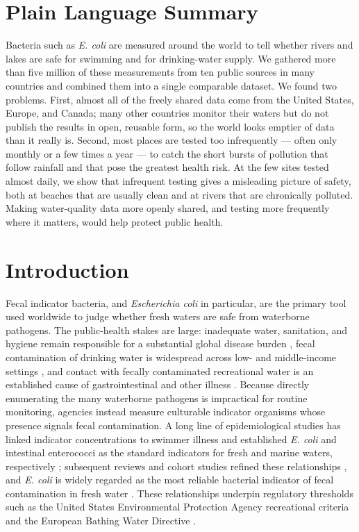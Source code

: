 \documentclass{agujournal2019}
\begin{document}
\section*{Plain Language Summary}
Bacteria such as \textit{E. coli} are measured around the world to tell whether rivers and lakes are safe for swimming and for drinking-water supply. We gathered more than five million of these measurements from ten public sources in many countries and combined them into a single comparable dataset. We found two problems. First, almost all of the freely shared data come from the United States, Europe, and Canada; many other countries monitor their waters but do not publish the results in open, reusable form, so the world looks emptier of data than it really is. Second, most places are tested too infrequently --- often only monthly or a few times a year --- to catch the short bursts of pollution that follow rainfall and that pose the greatest health risk. At the few sites tested almost daily, we show that infrequent testing gives a misleading picture of safety, both at beaches that are usually clean and at rivers that are chronically polluted. Making water-quality data more openly shared, and testing more frequently where it matters, would help protect public health.

\section{Introduction}

Fecal indicator bacteria, and \textit{Escherichia coli} in particular, are the primary tool used worldwide to judge whether fresh waters are safe from waterborne pathogens. The public-health stakes are large: inadequate water, sanitation, and hygiene remain responsible for a substantial global disease burden \cite{prssustn2014burden,prssstn2019burden,wolf2023burden}, fecal contamination of drinking water is widespread across low- and middle-income settings \cite{bain2014fecal,bain2014global}, and contact with fecally contaminated recreational water is an established cause of gastrointestinal and other illness \cite{gerdes2023estimating,wade2022health,zmirou2003risks}. Because directly enumerating the many waterborne pathogens is impractical for routine monitoring, agencies instead measure culturable indicator organisms whose presence signals fecal contamination. A long line of epidemiological studies has linked indicator concentrations to swimmer illness and established \textit{E. coli} and intestinal enterococci as the standard indicators for fresh and marine waters, respectively ; subsequent reviews and cohort studies refined these relationships \cite{prss1998review,wade2003environmental,wade2005rapidly,wade2010rapidly}, and \textit{E. coli} is widely regarded as the most reliable bacterial indicator of fecal contamination in fresh water \cite{edberg2000escherichia,boehm2014enterococci,korajkic2018relationships}. These relationships underpin regulatory thresholds such as the United States Environmental Protection Agency recreational criteria and the European Bathing Water Directive \cite{epa2012recreational,eu2006bathing,who2021recreational,boehm2008sea}.
\end{document}
